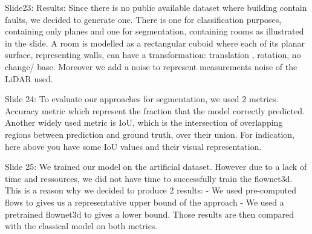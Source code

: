 Slide23: Results:
Since there is no public available dataset where building contain faults, we decided to generate one. There is one for classification purposes, containing only planes and one for segmentation, containing rooms as illustrated in the slide.
A room is modelled as a rectangular cuboid where each of its planar surface, representing walls, can have a transformation: translation , rotation, no change/ base. Moreover we add a noise to represent measurements noise of the LiDAR used.

Slide 24:
To evaluate our approaches for segmentation, we used 2 metrics. Accuracy metric which represent the fraction that the model correctly predicted.
Another widely used metric is IoU, which is the intersection of overlapping regions between prediction and ground truth, over their union.
For indication, here above you have some IoU values and their visual representation.

Slide 25:
We trained our model on the artificial dataset. However due to a lack of time and ressources, we did not have time to successfully train the flownet3d. 
This is a reason why we decided to produce 2 results:
-	We used pre-computed flows to gives us a representative upper bound of the approach
-	We used a pretrained flownet3d to gives a lower bound.
Those results are then compared with the classical model on both metrics.







